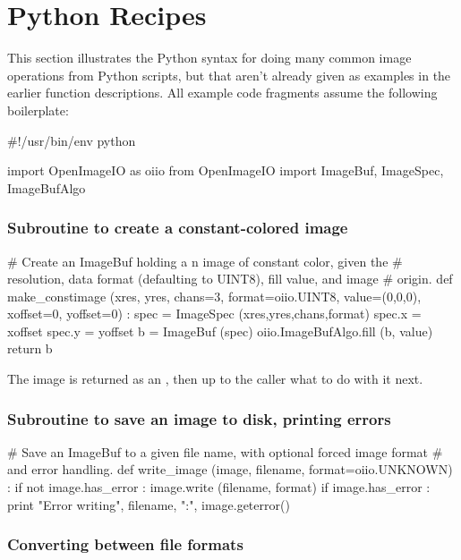 \section{Python Recipes}
\label{sec:pythonrecipes}

This section illustrates the Python syntax for doing many common image
operations from Python scripts, but that aren't already given as examples
in the earlier function descriptions.  All example code fragments assume the
following boilerplate:

\begin{code}
    #!/usr/bin/env python 
    
    import OpenImageIO as oiio
    from OpenImageIO import ImageBuf, ImageSpec, ImageBufAlgo
\end{code}


\subsubsection*{Subroutine to create a constant-colored image}
\begin{code}
    # Create an ImageBuf holding a n image of constant color, given the
    # resolution, data format (defaulting to UINT8), fill value, and image
    # origin.
    def make_constimage (xres, yres, chans=3, format=oiio.UINT8, value=(0,0,0),
                         xoffset=0, yoffset=0) :
        spec = ImageSpec (xres,yres,chans,format)
        spec.x = xoffset
        spec.y = yoffset
        b = ImageBuf (spec)
        oiio.ImageBufAlgo.fill (b, value)
        return b
\end{code}

\noindent The image is returned as an \ImageBuf, then up to the caller 
what to do with it next.

\subsubsection*{Subroutine to save an image to disk, printing errors}
\begin{code}
    # Save an ImageBuf to a given file name, with optional forced image format
    # and error handling.
    def write_image (image, filename, format=oiio.UNKNOWN) :
        if not image.has_error :
            image.write (filename, format)
        if image.has_error :
            print "Error writing", filename, ":", image.geterror()
\end{code}


\subsubsection*{Converting between file formats}

